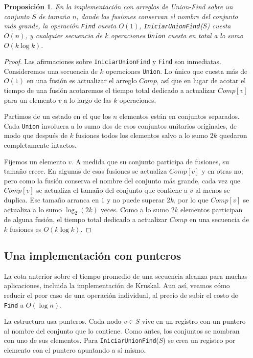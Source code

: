 \documentclass[12pt, spanish, oneside, openany]{book}
\theoremstyle{uprightplain}
\newtheorem{proposicion}[teorema]{Proposición}
\theoremstyle{definition}
\theoremstyle{remark}
\theoremstyle{definition}
\begin{document}
\begin{proposicion}
\label{prop:uf-arreglos}
En la implementación con arreglos de Union-Find sobre un conjunto $S$ de tamaño $n$, donde las fusiones conservan el nombre del conjunto más grande, la operación \texttt{Find} cuesta $O(1)$, \texttt{IniciarUnionFind}($S$) cuesta $O(n)$, y cualquier secuencia de $k$ operaciones \texttt{Union} cuesta en total a lo sumo $O(k\log k)$.
\end{proposicion}
\begin{proof}
Las afirmaciones sobre \texttt{IniciarUnionFind} y \texttt{Find} son inmediatas. Consideremos una secuencia de $k$ operaciones \texttt{Union}. Lo único que cuesta más de $O(1)$ en una fusión es actualizar el arreglo $\mathit{Comp}$, así que en lugar de acotar el tiempo de una fusión acotaremos el tiempo total dedicado a actualizar $\mathit{Comp}[v]$ para un elemento $v$ a lo largo de las $k$ operaciones.

Partimos de un estado en el que los $n$ elementos están en conjuntos separados. Cada \texttt{Union} involucra a lo sumo dos de esos conjuntos unitarios originales, de modo que después de $k$ fusiones todos los elementos salvo a lo sumo $2k$ quedaron completamente intactos.

Fijemos un elemento $v$. A medida que su conjunto participa de fusiones, su tamaño crece. En algunas de esas fusiones se actualiza $\mathit{Comp}[v]$ y en otras no; pero como la fusión conserva el nombre del conjunto más grande, cada vez que $\mathit{Comp}[v]$ se actualiza el tamaño del conjunto que contiene a $v$ al menos se duplica. Ese tamaño arranca en $1$ y no puede superar $2k$, por lo que $\mathit{Comp}[v]$ se actualiza a lo sumo $\log_2(2k)$ veces. Como a lo sumo $2k$ elementos participan de alguna fusión, el tiempo total dedicado a actualizar $\mathit{Comp}$ en una secuencia de $k$ fusiones es $O(k\log k)$.
\end{proof}

\subsection{Una implementación con punteros}

La cota anterior sobre el tiempo promedio de una secuencia alcanza para muchas aplicaciones, incluida la implementación de Kruskal. Aun así, veamos cómo reducir el peor caso de una operación individual, al precio de subir el costo de \texttt{Find} a $O(\log n)$.

La estructura usa punteros. Cada nodo $v \in S$ vive en un registro con un puntero al nombre del conjunto que lo contiene. Como antes, los conjuntos se nombran con uno de sus elementos. Para \texttt{IniciarUnionFind}($S$) se crea un registro por elemento con el puntero apuntando a sí mismo.
\end{document}
